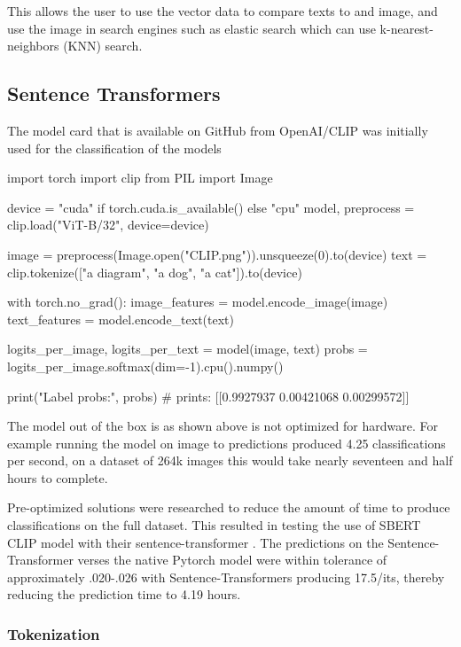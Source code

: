 \documentclass[article, 10pt]{article}
\begin{document}
This allows the user to use the vector data to compare texts to and image, and use the image in search engines such as elastic search which can use  k-nearest-neighbors (KNN) search. 

\subsection{Sentence Transformers}
The model card that is available on GitHub from OpenAI/CLIP was initially used for the classification of the models
\begin{python}
import torch
import clip
from PIL import Image

device = "cuda" if torch.cuda.is_available() else "cpu"
model, preprocess = clip.load("ViT-B/32", device=device)

image = preprocess(Image.open("CLIP.png")).unsqueeze(0).to(device)
text = clip.tokenize(["a diagram", "a dog", "a cat"]).to(device)

with torch.no_grad():
    image_features = model.encode_image(image)
    text_features = model.encode_text(text)
    
    logits_per_image, logits_per_text = model(image, text)
    probs = logits_per_image.softmax(dim=-1).cpu().numpy()

print("Label probs:", probs)  # prints: [[0.9927937  0.00421068 0.00299572]]
\end{python} \cite{OpenAI}
The model out of the box is as shown above is not optimized for hardware. For example running the model on image to predictions produced 4.25 classifications per second, on a dataset of 264k images this would take nearly seventeen and half hours to complete. 

Pre-optimized solutions were researched to reduce the amount of time to produce classifications on the full dataset. This resulted in testing the use of SBERT CLIP model with their sentence-transformer \cite{SBERT}.
The predictions on the Sentence-Transformer verses the native Pytorch model were within
tolerance of approximately .020-.026 with Sentence-Transformers producing 17.5/its, thereby reducing the prediction time to 4.19 hours.

\subsubsection{Tokenization}
\end{document}
